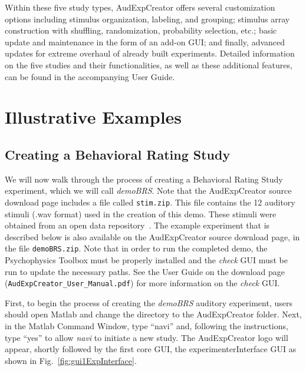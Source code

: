 \documentclass[preprint,12pt, a4paper]{elsarticle}
\begin{document}
Within these five study types, AudExpCreator offers several customization options including stimulus organization, labeling, and grouping; stimulus array construction with shuffling, randomization, probability selection, etc.; basic update and maintenance in the form of an add-on GUI; and finally, advanced updates for extreme overhaul of already built experiments. Detailed information on the five studies and their functionalities, as well as these additional features, can be found in the accompanying User Guide. 

\section{Illustrative Examples}
\label{sec:illustrative}

\subsection{Creating a Behavioral Rating Study}


We will now walk through the process of creating a Behavioral Rating Study experiment, which we will call \textit{demoBRS}. Note that the AudExpCreator source download page includes a file called \texttt{stim.zip}. This file contains the 12 auditory stimuli (.wav format) used in the creation of this demo. These stimuli were obtained from an open data repository~\cite{kaneshiro2012SDR}. The example experiment that is described below is also available on the AudExpCreator source download page, in the file \texttt{demoBRS.zip}. Note that in order to run the completed demo, the Psychophysics Toolbox must be properly installed and the \textit{check} GUI must be run to update the necessary paths. See the User Guide on the download page (\texttt{AudExpCreator\_User\_Manual.pdf}) for more information on the \textit{check} GUI.

First, to begin the process of creating the \textit{demoBRS} auditory experiment, users should open Matlab and change the directory to the AudExpCreator folder. 
Next, in the Matlab Command Window, type ``navi'' and, following the instructions, type ``yes'' to allow \textit{navi} to initiate a new study. The AudExpCreator logo will appear, shortly followed by the first core GUI, the experimenterInterface GUI as shown in Fig.~\ref{fig:gui1ExpInterface}. 
\end{document}

